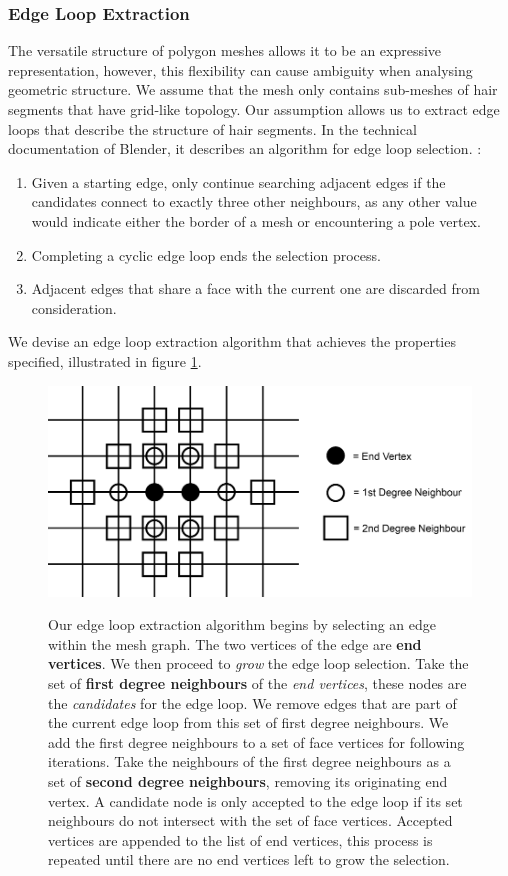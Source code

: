 \documentclass[ %
author={Dillon Keith Diep},
supervisor={Dr. Carl Henrik Ek},
degree={MEng},
title={ART-CG:},
subtitle={Assisted Real-time Content Generation of 3D Hair by Learning Manifolds},
type={Research},
year={2017} ]{dissertation}
\begin{document}
\subsubsection{Edge Loop Extraction}
The versatile structure of polygon meshes allows it to be an expressive representation, however, this flexibility can cause ambiguity when analysing geometric structure. We assume that the mesh only contains sub-meshes of hair segments that have grid-like topology. Our assumption allows us to extract edge loops that describe the structure of hair segments. In the technical documentation of Blender, it describes an algorithm for edge loop selection. \cite{blenderedgeloop}:
\begin{enumerate}
\item Given a starting edge, only continue searching adjacent edges if the candidates connect to exactly three other neighbours, as any other value would indicate either the border of a mesh or encountering a pole vertex.
\item Completing a cyclic edge loop ends the selection process.
\item Adjacent edges that share a face with the current one are discarded from consideration.
\end{enumerate}
We devise an edge loop extraction algorithm that achieves the properties specified, illustrated in figure \ref{edgeLoopFig}.

\begin{figure}[!h]
	\centering
	\caption{Our edge loop extraction algorithm begins by selecting an edge within the mesh graph. The two vertices of the edge are \textbf{end vertices}. We then proceed to \textit{grow} the edge loop selection. Take the set of \textbf{first degree neighbours} of the \textit{end vertices}, these nodes are the \textit{candidates} for the edge loop. We remove edges that are part of the current edge loop from this set of first degree neighbours. We add the first degree neighbours to a set of face vertices for following iterations. Take the neighbours of the first degree neighbours as a set of \textbf{second degree neighbours}, removing its originating end vertex. A candidate node is only accepted to the edge loop if its set neighbours do not intersect with the set of face vertices. Accepted vertices are appended to the list of end vertices, this process is repeated until there are no end vertices left to grow the selection.}
	\includegraphics[scale=0.35]{images/edgeLoopDiagram}\\
	
	\label{edgeLoopFig}
\end{figure}
\end{document}
